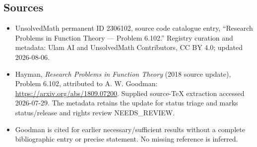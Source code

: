 \documentclass[11pt]{article}
\begin{document}
\subsection{Sources}
\begin{itemize}
\item UnsolvedMath permanent ID 2306102, source code catalogue entry, ``Research Problems in Function Theory --- Problem 6.102.'' Registry curation and metadata: Ulam AI and UnsolvedMath Contributors, CC BY 4.0; updated 2026-08-06.
\item Hayman, \emph{Research Problems in Function Theory} (2018 source update), Problem 6.102, attributed to A. W. Goodman: \url{https://arxiv.org/abs/1809.07200}. Supplied source-TeX extraction accessed 2026-07-29. The metadata retains the update for status triage and marks status/release and rights review NEEDS\_REVIEW.
\item Goodman is cited for earlier necessary/sufficient results without a complete bibliographic entry or precise statement. No missing reference is inferred.
\end{itemize}
\end{document}
